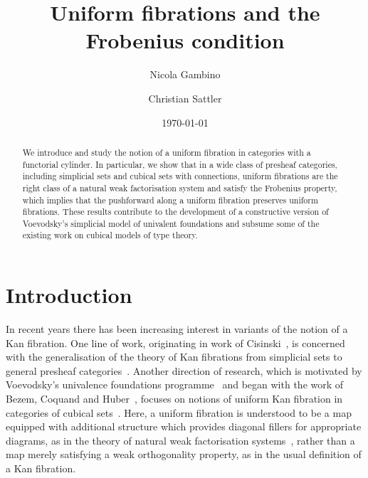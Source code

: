 \documentclass[reqno,10pt,a4paper,oneside,draft]{amsart}
\title{Uniform fibrations and the Frobenius condition}
\begin{document}
\begin{abstract}
We introduce and study the notion of a uniform fibration in categories with a functorial cylinder. In particular,
we show that in a wide class of presheaf categories, including simplicial sets and cubical sets with connections,
uniform fibrations are the right class of a natural weak factorisation  system and satisfy the Frobenius property,
which implies that the pushforward along a uniform fibration preserves uniform fibrations. These results contribute
to the development of a constructive version of Voevodsky's simplicial model of univalent foundations and
subsume some of the existing work on cubical models of type theory.
\end{abstract}

\author{Nicola Gambino}
\address{School of Mathematics, University of Leeds, Leeds LS2 9JT, UK}

\author{Christian Sattler}
\address{School of Mathematics, University of Leeds, Leeds LS2 9JT, UK}

\date{\today}

\maketitle

\tableofcontents


\section{Introduction}

In recent years there has been increasing interest in variants of the notion of a Kan fibration.
One line of work, originating in work of Cisinski~\cite{cisinski-asterisque}, is concerned with the generalisation of the theory of Kan fibrations from simplicial sets to general presheaf categories~\cite{cisinski-univalence,moerdijk-minimal}.
Another direction of research, which is motivated by Voevodsky's univalence foundations programme~\cite{voevodsky:uf} and began with the work of Bezem, Coquand and Huber~\cite{coquand-cubical-sets}, focuses on notions of uniform Kan fibration in categories of cubical sets~\cite{awodey-cubical,coquand-variation, huber-thesis,pitts-cubical-nominal,swan-awfs}.
Here, a uniform fibration is understood to be a map equipped with additional structure which provides diagonal fillers for appropriate diagrams, as in the theory of natural weak factorisation systems~\cite{grandis-tholen-nwfs}, rather than a map merely satisfying a weak orthogonality property, as in the usual definition of a Kan fibration.
\end{document}
